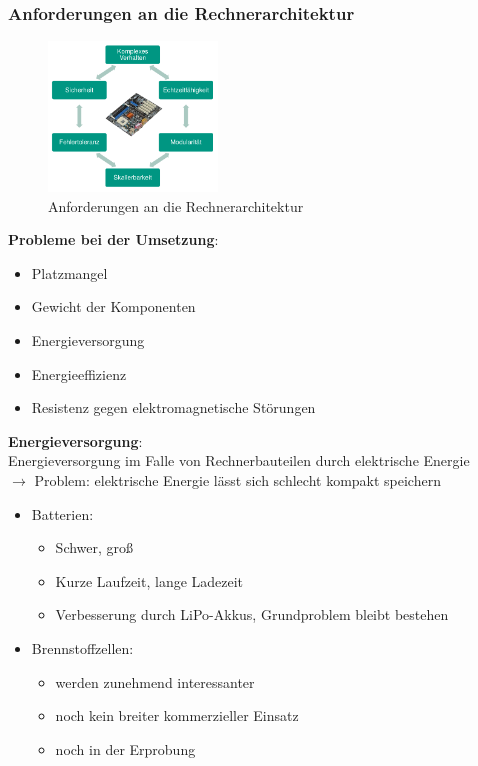 \subsubsection{Anforderungen an die Rechnerarchitektur}
\begin{figure}[h!]
	\centering
	\includegraphics[width=0.4\textwidth]{figures/ch07_arch.png}
	\caption{Anforderungen an die Rechnerarchitektur}
	\label{arch}
\end{figure}
\textbf{Probleme bei der Umsetzung}:
\begin{itemize}
\item Platzmangel
\item Gewicht der Komponenten
\item Energieversorgung
\item Energieeffizienz
\item Resistenz gegen elektromagnetische Störungen
\end{itemize}
\textbf{Energieversorgung}:\\
Energieversorgung im Falle von Rechnerbauteilen durch elektrische Energie\\
$\rightarrow$ Problem: elektrische Energie lässt sich schlecht kompakt speichern
\begin{itemize}
\item Batterien:
\begin{itemize}
\item  Schwer, groß
\item Kurze Laufzeit, lange Ladezeit
\item Verbesserung durch LiPo-Akkus, Grundproblem bleibt bestehen
\end{itemize}
\item Brennstoffzellen:
\begin{itemize}
\item werden zunehmend interessanter
\item noch kein breiter kommerzieller Einsatz
\item noch in der Erprobung
\end{itemize}
\end{itemize}
